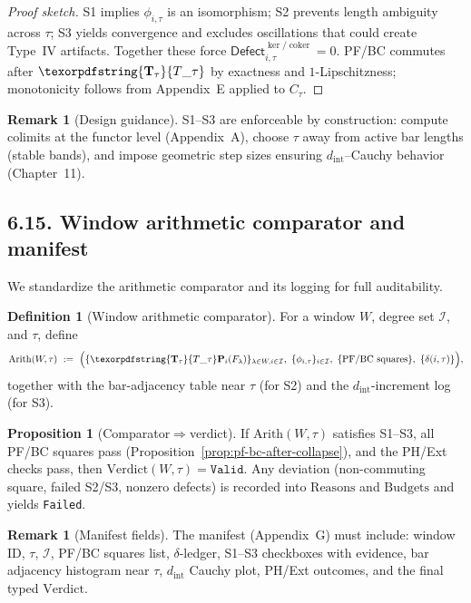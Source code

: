 \documentclass[11pt]{article}
\numberwithin{equation}{section}
\theoremstyle{plain}
\theoremstyle{definition}
\theoremstyle{remark}
\DeclareRobustCommand{\hyp}{\nobreakdash-}
\theoremstyle{plain}
\theoremstyle{definition}
\numberwithin{equation}{section}
\newtheorem{proposition}[theorem]{Proposition}
\theoremstyle{definition}
\newtheorem{definition}[theorem]{Definition}
\newtheorem{remark}[theorem]{Remark}
\DeclareRobustCommand{\Ttau}{\texorpdfstring{\ensuremath{\mathbf{T}_{\tau}}}{T\_\tau}}
\numberwithin{equation}{section}
\theoremstyle{plain}
\theoremstyle{definition}
\theoremstyle{remark}
\providecommand{\Tfun}[1]{\mathbf{T}_{#1}}
\providecommand{\Ttau}{\Tfun{\tau}}
\DeclareMathOperator{\coker}{coker} %
\providecommand{\Defect}{\mathsf{Defect}}
\begin{document}
\begin{proof}[Proof sketch]
S1 implies \(\phi_{i,\tau}\) is an isomorphism; S2 prevents length ambiguity across \(\tau\); S3 yields convergence and excludes oscillations that could create Type~IV artifacts. Together these force \(\Defect^{\ker/\coker}_{i,\tau}=0\). PF/BC commutes after \(\Ttau\) by exactness and $1$\hyp Lipschitzness; monotonicity follows from Appendix~E applied to \(C_\tau\).
\end{proof}

\begin{remark}[Design guidance]
S1–S3 are enforceable by construction: compute colimits at the functor level (Appendix~A), choose \(\tau\) away from active bar lengths (stable bands), and impose geometric step sizes ensuring $d_{\mathrm{int}}$–Cauchy behavior (Chapter~11).
\end{remark}

\subsection*{6.15. Window arithmetic comparator and manifest}
We standardize the arithmetic comparator and its logging for full auditability.

\begin{definition}[Window arithmetic comparator]\label{def:win-arith}
For a window \(W\), degree set \(\mathcal{I}\), and \(\tau\), define
\[
\mathrm{Arith}(W,\tau)\ :=\ \Big(\{\Ttau\mathbf{P}_i(F_\lambda)\}_{\lambda\in W,i\in\mathcal{I}},\ \{\phi_{i,\tau}\}_{i\in\mathcal{I}},\ \{\mathrm{PF/BC~squares}\},\ \{\delta(i,\tau)\}\Big),
\]
together with the bar\hyp adjacency table near \(\tau\) (for S2) and the $d_{\mathrm{int}}$\hyp increment log (for S3).
\end{definition}

\begin{proposition}[Comparator\texorpdfstring{$\Rightarrow$}{=>}verdict]\label{prop:arith-to-verdict}
If \(\mathrm{Arith}(W,\tau)\) satisfies S1–S3, all PF/BC squares pass (Proposition~\ref{prop:pf-bc-after-collapse}), and the PH/Ext checks pass, then \(\mathrm{Verdict}(W,\tau)=\texttt{Valid}\). Any deviation (non\hyp commuting square, failed S2/S3, nonzero defects) is recorded into \(\mathrm{Reasons}\) and \(\mathrm{Budgets}\) and yields \texttt{Failed}.
\end{proposition}

\begin{remark}[Manifest fields]
The manifest (Appendix~G) must include: window ID, \(\tau\), \(\mathcal{I}\), PF/BC squares list, \(\delta\)\hyp ledger, S1–S3 checkboxes with evidence, bar adjacency histogram near \(\tau\), $d_{\mathrm{int}}$ Cauchy plot, PH/Ext outcomes, and the final typed \(\mathrm{Verdict}\).
\end{remark}
\end{document}
